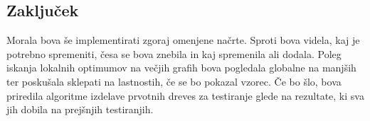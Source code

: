 \documentclass[a4paper, 12 pt]{article}
\begin{document}
{\subsection{Zaključek}

Morala bova še implementirati zgoraj omenjene načrte. Sproti bova videla, kaj je potrebno spremeniti, česa se bova znebila in kaj spremenila ali dodala. Poleg iskanja lokalnih optimumov na večjih grafih bova pogledala globalne na manjših ter poskušala sklepati na lastnostih, če se bo pokazal vzorec. Če bo šlo, bova priredila algoritme izdelave prvotnih dreves za testiranje glede na rezultate, ki sva jih dobila na prejšnjih testiranjih.}
\end{document}
